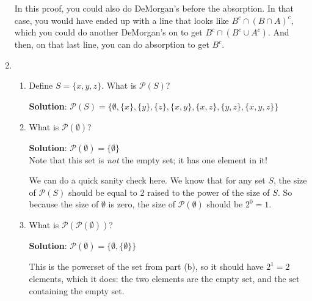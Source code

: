 \documentclass[11pt, letterpaper]{report}
\newcommand{\powerset}[1]{\mathcal P\left({#1}\right)}
\begin{document}
\begin{enumerate}
        In this proof, you could also do DeMorgan's before the absorption.  In that case,
        you would have ended up with a line that looks like $B^c \cap (B \cap A)^c$, which
        you could do another DeMorgan's on to get $B^c \cap (B^c \cup A^c)$.  And then, on
        that last line, you can do absorption to get $B^c$.
        
        
        
           \item    
\begin{enumerate}
                \item Define $S = \{x,y,z\}$.  What is $\powerset{S}$?
                
                \textbf{Solution}: $\powerset{S} = \{\emptyset, \{x\}, \{y\}, \{z\}, \{x,y\},\{x,z\},\{y,z\}, \{x,y,z\}\}$
                \item What is $\powerset{\emptyset}$?
                
                \textbf{Solution}: $\powerset{\emptyset}= \{\emptyset\}$ \\
                Note that this set is \emph{not} the empty set; it has one element in it!
                
                We can do a quick sanity check here.  We know that for any set $S$, the size of $\powerset{S}$
                should be equal to 2 raised to the power of the size of $S$.  So because the size of $\emptyset$
                is zero, the size of  $\powerset{\emptyset}$ should be $2^0=1$.

                \item What is $\powerset{\powerset{\emptyset}}$?
                
                \textbf{Solution}: $\powerset{\emptyset}= \{\emptyset , \{\emptyset\}\}$ 
                
                This is the powerset of the set from part (b), so it should have $2^1=2$ elements, which it does:
                the two elements are the empty set, and the set containing the empty set.
        \end{enumerate}

\end{enumerate}
\end{document}
